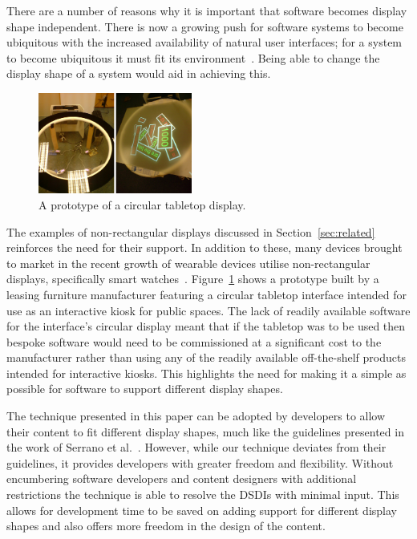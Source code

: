 \documentclass[twocolumn,compsoc]{cvm}
\begin{document}
{There are a number of reasons why it is important that software becomes display shape independent.
There is now a growing push for software systems to become ubiquitous with the increased availability of natural user interfaces; for a system to become ubiquitous it must fit its environment~\cite{Greenfield2006}.
Being able to change the display shape of a system would aid in achieving this.

\begin{figure}[h!]
 \centering
   \includegraphics[width=0.45\textwidth]{figures/PrototypeTabletop.jpeg}
   \caption{A prototype of a circular tabletop display.}
   \label{fig:prototypeTabletop}
\end{figure}

The examples of non-rectangular displays discussed in Section~\ref{sec:related} reinforces the need for their support.
In addition to these, many devices brought to market in the recent growth of wearable devices utilise non-rectangular displays, specifically smart watches~\cite{Jung2016}.
Figure~\ref{fig:prototypeTabletop} shows a prototype built by a leasing furniture manufacturer featuring a circular tabletop interface intended for use as an interactive kiosk for public spaces.
The lack of readily available software for the interface's circular display meant that if the tabletop was to be used then bespoke software would need to be commissioned at a significant cost to the manufacturer rather than using any of the readily available off-the-shelf products intended for interactive kiosks.
This highlights the need for making it a simple as possible for software to support different display shapes.

The technique presented in this paper can be adopted by developers to allow their content to fit different display shapes, much like the guidelines presented in the work of Serrano et al.~\cite{Serrano2016,Serrano2017}.
However, while our technique deviates from their guidelines, it provides developers with greater freedom and flexibility.
Without encumbering software developers and content designers with additional restrictions the technique is able to resolve the \acp{DSDI} with minimal input.
This allows for development time to be saved on adding support for different display shapes and also offers more freedom in the design of the content.

}
\end{document}
